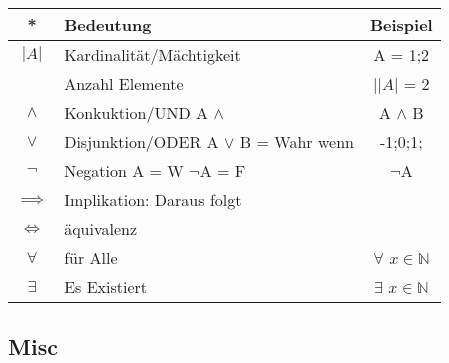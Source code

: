 \begin{multicols}{3}
    \begin{tabularx}{\columnwidth} {
        | >{\raggedright\arraybackslash}c
        | >{\raggedright\arraybackslash}X
        | >{\raggedright\arraybackslash}c|}
    \hline
    \textbf{*}            & \textbf{Bedeutung}                        & \textbf{Beispiel}             \\ \hline
    $|A|$                 & Kardinalität/Mächtigkeit      & A = {1;2}                     \\
                          & Anzahl Elemente               & |$|A|$ = 2                    \\ \hline
    $\land$               & Konkuktion/UND A $\land$    & A $\land$ B                   \\ \hline
    $\lor$                & Disjunktion/ODER A $\lor$ B  = Wahr wenn  & {-1;0;1;}                     \\\hline
    $\neg$                & Negation A = W $\neg$A = F      & $\neg $A                      \\\hline
    $\implies$            & Implikation: Daraus folgt                 &                               \\ \hline
    $\Longleftrightarrow$ & äquivalenz  &                               \\ \hline
    $\forall$             & für Alle                                  & $\forall$ $x \in \mathbb{N}$  \\ \hline
    $\exists$             & Es Existiert                              & $\exists $ $x \in \mathbb{N}$ \\ \hline
    \end{tabularx}
\subsection*{Misc}

\newpage
\end{multicols}